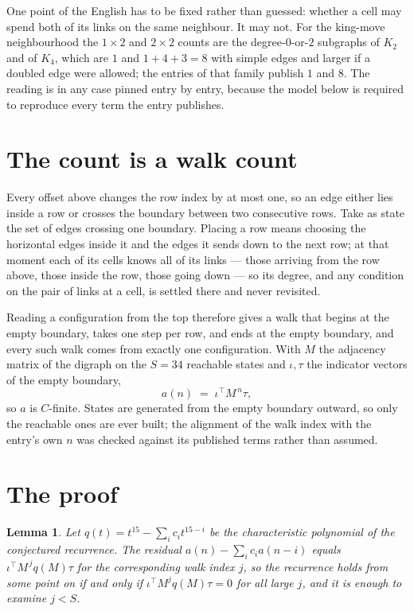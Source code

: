\documentclass[11pt,a4paper]{article}
\theoremstyle{plain}
\newtheorem{lemma}[theorem]{Lemma}
\theoremstyle{definition}
\begin{document}
One point of the English has to be fixed rather than guessed: whether a cell may spend both of
its links on the same neighbour. It may not. For the king-move neighbourhood the $1\times2$
and $2\times2$ counts are the degree-$0$-or-$2$ subgraphs of $K_2$ and of $K_4$, which are $1$
and $1+4+3=8$ with simple edges and larger if a doubled edge were allowed; the entries of that
family publish $1$ and $8$. The reading is in any case pinned entry by entry, because the
model below is required to reproduce every term the entry publishes.


\section{The count is a walk count}

Every offset above changes the row index by at most one, so an edge either lies inside a row
or crosses the boundary between two consecutive rows. Take as state the set of edges crossing
one boundary. Placing a row means choosing the horizontal edges inside it and the edges it
sends down to the next row; at that moment each of its cells knows all of its links --- those
arriving from the row above, those inside the row, those going down --- so its degree, and any
condition on the pair of links at a cell, is settled there and never revisited.

Reading a configuration from the top therefore gives a walk that begins at the empty boundary,
takes one step per row, and ends at the empty boundary, and every such walk comes from exactly
one configuration. With $M$ the adjacency matrix of the digraph on the $S=34$ reachable
states and $\iota,\tau$ the indicator vectors of the empty boundary,
\[
a(n)\;=\;\iota^{\!\top}M^{\,n}\tau ,
\]
so $a$ is $C$-finite. States are generated from the empty boundary outward, so only the
reachable ones are ever built; the alignment of the walk index with the entry's own $n$ was
checked against its published terms rather than assumed.

\section{The proof}

\begin{lemma}\label{lem:crit}
Let $q(t)=t^{15}-\sum_i c_it^{15-i}$ be the characteristic polynomial of the
conjectured recurrence. The residual $a(n)-\sum_ic_ia(n-i)$ equals
$\iota^{\!\top}M^{\,j}q(M)\tau$ for the corresponding walk index $j$, so the recurrence
holds from some point on if and only if $\iota^{\!\top}M^{j}q(M)\tau=0$ for all large $j$,
and it is enough to examine $j<S$.
\end{lemma}
\end{document}
